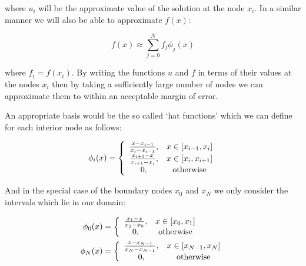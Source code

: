 where $u_i$ will be the approximate value of the solution at the node $x_i$. In
a similar manner we will also be able to approximate $f(x)$:

\begin{equation}
    f(x) \approx \sum_{j = 0}^N f_j\phi_j(x)
\end{equation}

where $f_i = f(x_i)$. By writing the functions $u$ and $f$ in terms of their
values at the nodes $x_i$ then by taking a sufficiently large number of nodes
we can approximate them to within an acceptable margin of error.


An appropriate basis would be the so called `hat functions' which we can define
for each interior node as follows:

\begin{equation}\label{eq:one-d-hat-basis}
    \phi_i(x) = \left\{\begin{array}{c c}
                    \frac{x - x_{i-1}}{x_i - x_{i - 1}}, & x \in [x_{i-1}, x_i] \\
                    \frac{x_{i+1} - x}{x_{i + 1} - x_i}, & x \in [x_i, x_{i + 1}] \\
                    0, & \text{otherwise}
                \end{array}\right.
\end{equation}

And in the special case of the boundary nodes $x_0$ and $x_N$ we only consider
the intervals which lie in our domain:

\begin{align}
    \phi_0(x) &= \left\{\begin{array}{c c}
                    \frac{x_1 - x}{x_1 - x_0}, & x \in [x_0, x_1] \\
                    0, & \text{otherwise}
    \end{array}\right.
    \\
    \phi_N(x) &= \left\{\begin{array}{c c}
                    \frac{x - x_{N - 1}}{x_N - x_{N-1}}, & x \in [x_{N-1}, x_N] \\
                    0, & \text{otherwise}
    \end{array}\right.
\end{align}

